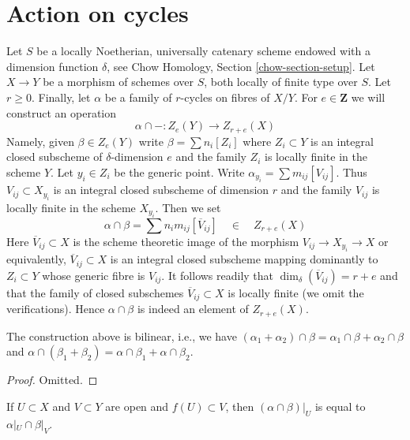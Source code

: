 \section{Action on cycles}
\label{section-action}

\noindent
Let $S$ be a locally Noetherian, universally catenary scheme endowed
with a dimension function $\delta$, see
Chow Homology, Section \ref{chow-section-setup}.
Let $X \to Y$ be a morphism of schemes over $S$, both locally of finite
type over $S$. Let $r \geq 0$. Finally, let $\alpha$ be a family of
$r$-cycles on fibres of $X/Y$. For $e \in \mathbf{Z}$
we will construct an operation
$$
\alpha \cap - : Z_e(Y) \longrightarrow Z_{r + e}(X)
$$
Namely, given $\beta \in Z_e(Y)$ write $\beta = \sum n_i[Z_i]$
where $Z_i \subset Y$ is an integral closed subscheme of
$\delta$-dimension $e$ and the
family $Z_i$ is locally finite in the scheme $Y$.
Let $y_i \in Z_i$ be the generic point. Write
$\alpha_{y_i} = \sum m_{ij} [V_{ij}]$. Thus $V_{ij} \subset X_{y_i}$
is an integral closed subscheme of dimension $r$ and the family
$V_{ij}$ is locally finite in the scheme $X_{y_i}$.
Then we set
$$
\alpha \cap \beta = \sum n_i m_{ij} [\overline{V}_{ij}]
\quad\in\quad
Z_{r + e}(X)
$$
Here $\overline{V}_{ij} \subset X$ is the scheme theoretic image
of the morphism $V_{ij} \to X_{y_i} \to X$ or equivalently,
$\overline{V}_{ij} \subset X$ is an integral closed subscheme
mapping dominantly to $Z_i \subset Y$ whose generic fibre is $V_{ij}$.
It follows readily that $\dim_\delta(\overline{V}_{ij}) = r + e$
and that the family of closed subschemes
$\overline{V}_{ij} \subset X$ is locally finite (we omit the verifications).
Hence $\alpha \cap \beta$ is indeed an element of $Z_{r + e}(X)$.

\begin{lemma}
\label{lemma-action-bilinear}
The construction above is bilinear, i.e., we have
$(\alpha_1 + \alpha_2) \cap \beta = \alpha_1 \cap \beta +
\alpha_2 \cap \beta$ and $\alpha \cap (\beta_1 + \beta_2) =
\alpha \cap \beta_1 + \alpha \cap \beta_2$.
\end{lemma}

\begin{proof}
Omitted.
\end{proof}

\begin{lemma}
\label{lemma-action-opens}
If $U \subset X$ and $V \subset Y$ are open and $f(U) \subset V$, then
$(\alpha \cap \beta)|_U$ is equal to $\alpha|_U \cap \beta|_V$.
\end{lemma}

